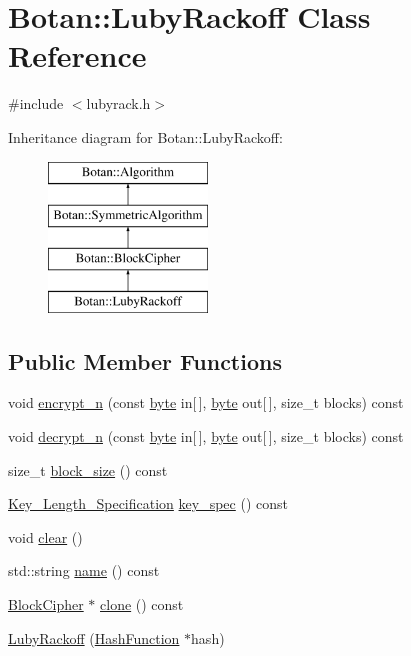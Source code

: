 \hypertarget{classBotan_1_1LubyRackoff}{\section{Botan\-:\-:Luby\-Rackoff Class Reference}
\label{classBotan_1_1LubyRackoff}
}


{\ttfamily \#include $<$lubyrack.\-h$>$}

Inheritance diagram for Botan\-:\-:Luby\-Rackoff\-:\begin{figure}[H]
\begin{center}
\leavevmode
\includegraphics[height=4.000000cm]{classBotan_1_1LubyRackoff}
\end{center}
\end{figure}
\subsection*{Public Member Functions}
\begin{DoxyCompactItemize}
\item 
void \hyperlink{classBotan_1_1LubyRackoff_a0230c1ae870822505ee897caa22a7386}{encrypt\-\_\-n} (const \hyperlink{namespaceBotan_a7d793989d801281df48c6b19616b8b84}{byte} in\mbox{[}$\,$\mbox{]}, \hyperlink{namespaceBotan_a7d793989d801281df48c6b19616b8b84}{byte} out\mbox{[}$\,$\mbox{]}, size\-\_\-t blocks) const 
\item 
void \hyperlink{classBotan_1_1LubyRackoff_adba66035400e94f1acd007903d318886}{decrypt\-\_\-n} (const \hyperlink{namespaceBotan_a7d793989d801281df48c6b19616b8b84}{byte} in\mbox{[}$\,$\mbox{]}, \hyperlink{namespaceBotan_a7d793989d801281df48c6b19616b8b84}{byte} out\mbox{[}$\,$\mbox{]}, size\-\_\-t blocks) const 
\item 
size\-\_\-t \hyperlink{classBotan_1_1LubyRackoff_a324eae6f091ceb88926956079cd67976}{block\-\_\-size} () const 
\item 
\hyperlink{classBotan_1_1Key__Length__Specification}{Key\-\_\-\-Length\-\_\-\-Specification} \hyperlink{classBotan_1_1LubyRackoff_acfa3f54596e4799f99502386eb0b08d8}{key\-\_\-spec} () const 
\item 
void \hyperlink{classBotan_1_1LubyRackoff_a5cb710f200772c7858c7aa116d4abf00}{clear} ()
\item 
std\-::string \hyperlink{classBotan_1_1LubyRackoff_affd63caa27bf21edf487e8d5c9877e1c}{name} () const 
\item 
\hyperlink{classBotan_1_1BlockCipher}{Block\-Cipher} $\ast$ \hyperlink{classBotan_1_1LubyRackoff_a7960c9e89ced91473dfde920a335fd3b}{clone} () const 
\item 
\hyperlink{classBotan_1_1LubyRackoff_af07584b772b216e44eb45be313f932ce}{Luby\-Rackoff} (\hyperlink{classBotan_1_1HashFunction}{Hash\-Function} $\ast$hash)
\end{DoxyCompactItemize}


